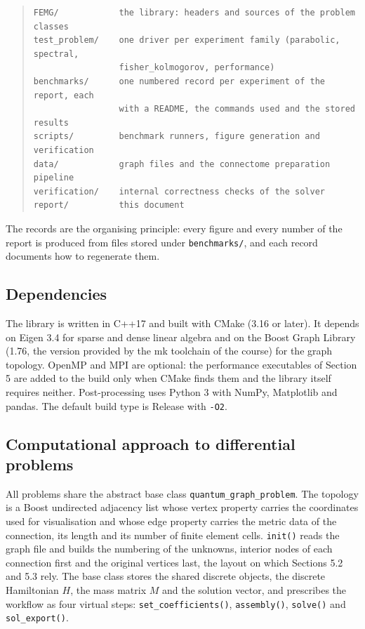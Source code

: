 \documentclass[11pt,a4paper]{article}
\begin{document}
\begin{quote}
\begin{footnotesize}
\begin{verbatim}
FEMG/            the library: headers and sources of the problem classes
test_problem/    one driver per experiment family (parabolic, spectral,
                 fisher_kolmogorov, performance)
benchmarks/      one numbered record per experiment of the report, each
                 with a README, the commands used and the stored results
scripts/         benchmark runners, figure generation and verification
data/            graph files and the connectome preparation pipeline
verification/    internal correctness checks of the solver
report/          this document
\end{verbatim}
\end{footnotesize}
\end{quote}

\noindent
The records are the organising principle: every figure and every number of
the report is produced from files stored under \texttt{benchmarks/}, and
each record documents how to regenerate them.

\subsection{Dependencies}

The library is written in C++17 and built with CMake (3.16 or later). It
depends on Eigen 3.4 for sparse and dense linear algebra and on the Boost
Graph Library (1.76, the version provided by the mk toolchain of the
course) for the graph topology. OpenMP and MPI are optional: the
performance executables of Section 5 are added to the build only when CMake
finds them and the library itself requires neither. Post-processing uses
Python 3 with NumPy, Matplotlib and pandas. The default build type is
Release with \texttt{-O2}.

\subsection{Computational approach to differential problems}

All problems share the abstract base class
\texttt{quantum\_graph\_problem}. The topology is a Boost undirected
adjacency list whose vertex property carries the coordinates used for
visualisation and whose edge property carries the metric data of the
connection, its length and its number of finite element cells.
\texttt{init()} reads the graph file and builds the numbering of the
unknowns, interior nodes of each connection first and the original vertices
last, the layout on which Sections 5.2 and 5.3 rely. The base class stores
the shared discrete objects, the discrete Hamiltonian $H$, the mass matrix
$M$ and the solution vector, and prescribes the workflow as four virtual
steps: \texttt{set\_coefficients()}, \texttt{assembly()}, \texttt{solve()}
and \texttt{sol\_export()}.
\end{document}
